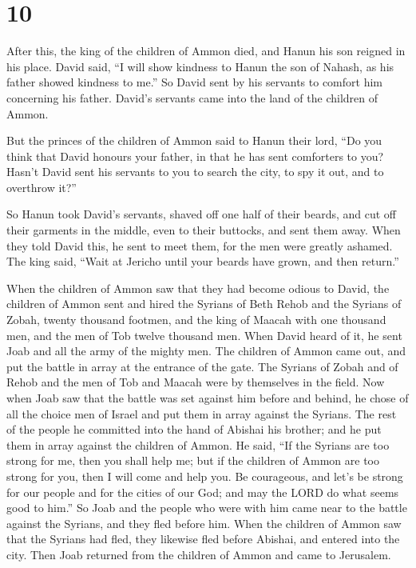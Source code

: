 \hypertarget{section-9}{%
\section{10}\label{section-9}}

 After this, the king of the children of Ammon died, and
Hanun his son reigned in his place.  David said, ``I will
show kindness to Hanun the son of Nahash, as his father showed kindness
to me.'' So David sent by his servants to comfort him concerning his
father. David's servants came into the land of the children of Ammon.

 But the princes of the children of Ammon said to Hanun
their lord, ``Do you think that David honours your father, in that he
has sent comforters to you? Hasn't David sent his servants to you to
search the city, to spy it out, and to overthrow it?''

 So Hanun took David's servants, shaved off one half of
their beards, and cut off their garments in the middle, even to their
buttocks, and sent them away.  When they told David this, he
sent to meet them, for the men were greatly ashamed. The king said,
``Wait at Jericho until your beards have grown, and then return.''

 When the children of Ammon saw that they had become odious
to David, the children of Ammon sent and hired the Syrians of Beth Rehob
and the Syrians of Zobah, twenty thousand footmen, and the king of
Maacah with one thousand men, and the men of Tob twelve thousand men.
 When David heard of it, he sent Joab and all the army of
the mighty men.  The children of Ammon came out, and put the
battle in array at the entrance of the gate. The Syrians of Zobah and of
Rehob and the men of Tob and Maacah were by themselves in the field.
 Now when Joab saw that the battle was set against him
before and behind, he chose of all the choice men of Israel and put them
in array against the Syrians.  The rest of the people he
committed into the hand of Abishai his brother; and he put them in array
against the children of Ammon.  He said, ``If the Syrians
are too strong for me, then you shall help me; but if the children of
Ammon are too strong for you, then I will come and help you.
 Be courageous, and let's be strong for our people and for
the cities of our God; and may the LORD do what seems good to him.''
 So Joab and the people who were with him came near to the
battle against the Syrians, and they fled before him.  When
the children of Ammon saw that the Syrians had fled, they likewise fled
before Abishai, and entered into the city. Then Joab returned from the
children of Ammon and came to Jerusalem.

